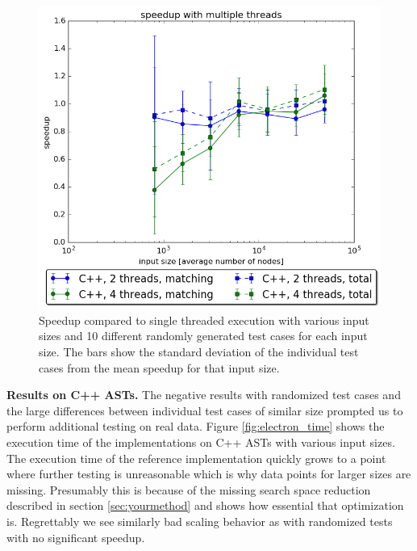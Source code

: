 \documentclass[letterpaper]{article}
\newcommand{\mypar}[1]{{\bf #1.}}
\begin{document}
\begin{figure}
	\includegraphics[width=\linewidth]{measurements/random/speedupPlot_c}
	\caption{Speedup compared to single threaded execution with various input sizes and 10 different randomly generated test cases for each input size. The bars show the standard deviation of the individual test cases from the mean speedup for that input size.}
	\label{fig:cpp_speedup}
\end{figure}

\mypar{Results on C++ ASTs}
The negative results with randomized test cases and the large differences between individual test cases of similar size prompted us to perform additional testing on real data.
Figure \ref{fig:electron_time} shows the execution time of the implementations on C++ ASTs with various input sizes.
The execution time of the reference implementation quickly grows to a point where further testing is unreasonable which is why data points for larger sizes are missing.
Presumably this is because of the missing search space reduction described in section \ref{sec:yourmethod} and shows how essential that optimization is.
Regrettably we see similarly bad scaling behavior as with randomized tests with no significant speedup.
\end{document}
